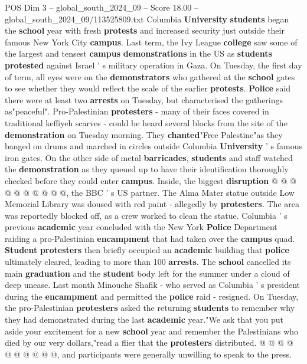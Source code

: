 \begin{textsample}{POS Dim 3 – global\_south\_2024\_09 – Score 18.00 – global\_south\_2024\_09/113525809.txt}  \label{ex:f3_pos_319}
Columbia \textbf{University} \textbf{students} began the \textbf{school} year with fresh \textbf{protests} and increased security just outside their famous New York City \textbf{campus}.
Last term, the Ivy League \textbf{college} saw some of the largest and tensest \textbf{campus} \textbf{demonstrations} in the US as \textbf{students} \textbf{protested} against Israel ' s military operation in Gaza.
On Tuesday, the first day of term, all eyes were on the \textbf{demonstrators} who gathered at the \textbf{school} gates to see whether they would reflect the scale of the earlier \textbf{protests}. \textbf{Police} said there were at least two \textbf{arrests} on Tuesday, but characterised the gatherings as"peaceful".
Pro-Palestinian \textbf{protesters} - many of their faces covered in traditional keffiyeh scarves - could be heard several blocks from the site of the \textbf{demonstration} on Tuesday morning.
They \textbf{chanted}"Free Palestine"as they banged on drums and marched in circles outside Columbia \textbf{University} ' s famous iron gates.
On the other side of metal \textbf{barricades}, \textbf{students} and staff watched the \textbf{demonstration} as they queued up to have their identification thoroughly checked before they could enter \textbf{campus}.
Inside, the biggest \textbf{disruption} @ @ @ @ @ @ @ @ @ @, the BBC ' s US partner.
The Alma Mater statue outside Low Memorial Library was doused with red paint - allegedly by \textbf{protesters}.
The area was reportedly blocked off, as a crew worked to clean the statue.
Columbia ' s previous \textbf{academic} year concluded with the New York \textbf{Police} Department raiding a pro-Palestinian \textbf{encampment} that had taken over the \textbf{campus} quad. \textbf{Student} \textbf{protesters} then briefly occupied an \textbf{academic} building that \textbf{police} ultimately cleared, leading to more than 100 \textbf{arrests}.
The \textbf{school} cancelled its main \textbf{graduation} and the \textbf{student} body left for the summer under a cloud of deep unease.
Last month Minouche Shafik - who served as Columbia ' s president during the \textbf{encampment} and permitted the \textbf{police} raid - resigned.
On Tuesday, the pro-Palestinian \textbf{protesters} asked the returning \textbf{students} to remember why they had demonstrated during the last \textbf{academic} year."We ask that you put aside your excitement for a new \textbf{school} year and remember the Palestinians who died by our very dollars,"read a flier that the \textbf{protesters} distributed. @ @ @ @ @ @ @ @ @ @, and participants were generally unwilling to speak to the press.

\end{textsample}
